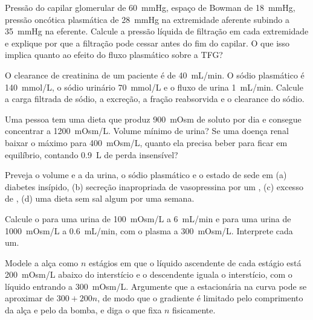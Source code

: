 \begin{exercise}[$\star\star$]\label{exo:b3:renal-osmoregulation:5}
Pressão do capilar glomerular de \qty{60}{mmHg}, espaço de Bowman de
\qty{18}{mmHg}, pressão oncótica plasmática de \qty{28}{mmHg} na
extremidade aferente subindo a \qty{35}{mmHg} na eferente. Calcule a
pressão líquida de filtração em cada extremidade e explique por que a
filtração pode cessar antes do fim do capilar. O que isso implica quanto
ao efeito do fluxo plasmático sobre a TFG?
\end{exercise}

\begin{exercise}[$\star\star$]\label{exo:b3:renal-osmoregulation:6}
O clearance de creatinina de um paciente é de \qty{40}{mL/min}. O sódio
plasmático é \qty{140}{mmol/L}, o sódio urinário \qty{70}{mmol/L} e o
fluxo de urina \qty{1}{mL/min}. Calcule a carga filtrada de sódio, a
excreção, a fração reabsorvida e o clearance do sódio.
\end{exercise}

\begin{exercise}[$\star\star$]\label{exo:b3:renal-osmoregulation:7}
Uma pessoa tem uma dieta que produz \qty{900}{mOsm} de soluto por dia e
consegue concentrar a \qty{1200}{mOsm/L}. Volume mínimo de urina? Se uma
doença renal baixar o máximo para \qty{400}{mOsm/L}, quanto ela precisa
beber para ficar em equilíbrio, contando \qty{0.9}{L} de perda
insensível?
\end{exercise}

\begin{exercise}[$\star\star$]\label{exo:b3:renal-osmoregulation:8}
Preveja o volume e a  da urina, o sódio plasmático e o
estado de sede em (a) diabetes insípido, (b) secreção inapropriada de
vasopressina por um , (c) excesso de , (d) uma dieta sem
sal algum por uma semana.
\end{exercise}

\begin{exercise}[$\star\star$]\label{exo:b3:renal-osmoregulation:9}
Calcule o  para uma urina de \qty{100}{mOsm/L} a
\qty{6}{mL/min} e para uma urina de \qty{1000}{mOsm/L} a
\qty{0.6}{mL/min}, com o plasma a \qty{300}{mOsm/L}. Interprete cada um.
\end{exercise}

\begin{exercise}[$\star\star\star$]\label{exo:b3:renal-osmoregulation:10}
Modele a alça como $n$ estágios em que o líquido ascendente de cada
estágio está \qty{200}{mOsm/L} abaixo do interstício e o descendente
iguala o interstício, com o líquido entrando a \qty{300}{mOsm/L}.
Argumente que a  estacionária na curva pode se aproximar de
$300 +
200n$, de modo que o gradiente é limitado pelo comprimento da
alça e pelo  da bomba, e diga o que fixa $n$ fisicamente.
\end{exercise}

